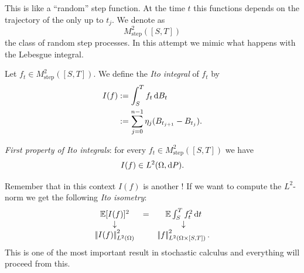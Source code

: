 \documentclass[crop=false, class=article]{standalone}
\begin{document}
This is like a ``random'' step function. At the time $t$ this functions depends on the trajectory of the \brm{} only up to $t_{j}$. We denote as 
\begin{equation*}
	M_{\mathrm{step}}^{2}([S,T])
\end{equation*}
the class of random step processes. In this attempt we mimic what happens with the Lebesgue integral.
\begin{definition}
	Let $f_t\in M_{\mathrm{step}}^2([S,T])$. We define the \emph{Ito integral} of $f_t$ by
	\begin{align*}
		I(f) & :=\int_{S}^{T}f_{t}\mathop{}\!\mathrm{d} B_{t} \\
		 & :=\sum_{j=0}^{n-1}\eta_j(B_{t_{j+1}}-B_{t_{j}}).
	\end{align*}
\end{definition}
\begin{proposition}
	\emph{First property of Ito integrals}: for every $f_t\in M^{2}_{\mathrm{step}}([S,T])$ we have
	\begin{equation*}
		I(f)\in L^2(\Omega, \mathop{}\!\mathrm{d} P).
	\end{equation*}
\end{proposition}
Remember that in this context $I(f)$ is another \rv! If we want to compute the $L^2$-norm we get the following \emph{Ito isometry}:
\begin{equation*}
	\begin{array}{ccc}
		\mathbb{E}[I(f)]^{2}&=&\mathbb{E}\int_{S}^Tf_{t}^{2}\mathop{}\!\mathrm{d} t\\
		\downarrow&&\downarrow\\
		\left|\negthinspace\left|I(f)\right|\negthinspace\right|^{2}_{L^2(\Omega)}&&\left|\negthinspace\left|f\right|\negthinspace\right|^{2}_{L^{2}(\Omega\times[S,T])}.
	\end{array}
\end{equation*}
This is one of the most important result in stochastic calculus and everything will proceed from this.
\end{document}
